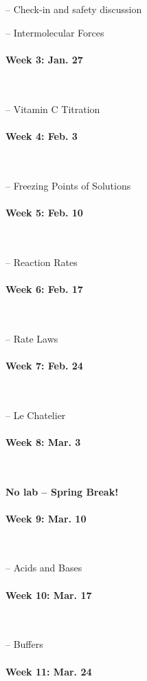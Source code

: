 \documentclass[12pt, letterpaper]{article}
\begin{document}
-- Check-in and safety discussion

-- Intermolecular Forces

\paragraph{Week 3: Jan. 27}~

-- Vitamin C Titration

\paragraph{Week 4: Feb. 3}~

-- Freezing Points of Solutions

\paragraph{Week 5: Feb. 10}~

-- Reaction Rates

\paragraph{Week 6: Feb. 17}~

-- Rate Laws

\paragraph{Week 7: Feb. 24}~

-- Le Chatelier

\paragraph{Week 8: Mar. 3}~

\textbf{No lab -- Spring Break!}

\paragraph{Week 9: Mar. 10}~

-- Acids and Bases

\paragraph{Week 10: Mar. 17}~

-- Buffers

\paragraph{Week 11: Mar. 24}~
\end{document}

